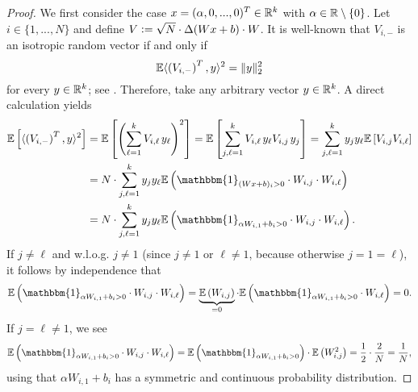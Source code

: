 \begin{proof}
We first consider the case $x = (\alpha,0,...,0)^T \in \mathbb{R}^k$ with $\alpha \in \mathbb{R} \setminus \{0\}$. Let $i \in \{1,...,N\}$ and define $V \mathrel{\mathop:}= \sqrt{N} \cdot \operatorname{\Delta}(Wx + b) \cdot W$. It is well-known that $V_{i,-}$ is an isotropic random vector if and only if
\begin{equation*}
    \mathbb{E} \langle \left(V_{i,-}\right)^T, y \rangle^2 = \Vert y \Vert_2^2
\end{equation*}
for every $y \in \mathbb{R}^k$; see \cite[Lemma 3.2.3]{vershynin_high-dimensional_2018}. Therefore, take any arbitrary vector $y \in \mathbb{R}^k$. A direct calculation yields
\begin{align}
    \EE \left[\langle \left(V_{i,-}\right)^T,y\rangle^2\right] &= \EE  \left[\left(\sum_{\ell=1}^k V_{i,\ell} \hspace{0.05cm} y_\ell\right)^2 \right] = \EE \left[\sum_{j, \ell = 1}^k V_{i,\ell} \hspace{0.05cm} y_\ell V_{i, j}\hspace{0.05cm} y_j \right] = \sum_{j, \ell = 1}^k y_j y_\ell \EE \left[V_{i,j} V_{i,\ell}\right] \nonumber\\
    &= N \cdot \sum_{j, \ell = 1}^k y_j y_\ell \EE \left(\mathbbm{1}_{(Wx + b)_i > 0} \cdot W_{i,j} \cdot W_{i, \ell}\right) \nonumber\\
    \label{eq: first_computation}
    &= N \cdot \sum_{j, \ell = 1}^k y_j y_\ell \EE \left(\mathbbm{1}_{\alpha W_{i,1} + b_i > 0} \cdot W_{i,j} \cdot W_{i, \ell}\right).
\end{align}
If $j \neq \ell$ and w.l.o.g. $j \neq 1$ (since $j \neq 1$ or $\ell \neq 1$, because otherwise $j = 1 = \ell$), it follows by independence that
\begin{equation} \label{eq: second_computation}
    \EE \left(\mathbbm{1}_{\alpha W_{i,1} + b_i> 0} \cdot W_{i,j} \cdot W_{i, \ell}\right) = \underbrace{\EE \left(W_{i,j}\right)}_{=0} \cdot \EE \left(\mathbbm{1}_{\alpha W_{i,1} +b_i> 0} \cdot W_{i, \ell}\right) = 0.
\end{equation}
If $j = \ell \neq 1$, we see
\begin{equation} \label{eq: third_computation}
    \EE \left(\mathbbm{1}_{\alpha W_{i,1} + b_i> 0} \cdot W_{i,j} \cdot W_{i, \ell}\right) = \EE \left(\mathbbm{1}_{\alpha W_{i,1} + b_i> 0}\right) \cdot \EE \left(W_{i,j}^2\right) = \frac{1}{2} \cdot \frac{2}{N} = \frac{1}{N},
\end{equation}
using that $\alpha W_{i,1} + b_i$ has a symmetric and continuous probability distribution.

\end{proof}
